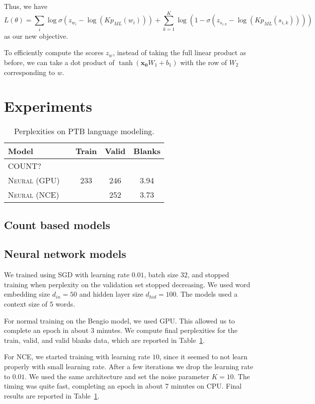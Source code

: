 \documentclass[11pt]{article}
\begin{document}
Thus, we have
$$L(\theta) = \sum_i \log \sigma(z_{w_i} - \log (Kp_{ML}(w_i))) + \sum_{k=1}^K \log(1 - \sigma(z_{s_{i,k}} - \log(Kp_{ML}(s_{i,k}))))$$
as our new objective.

To efficiently compute the scores $z_{w}$, instead of taking the full linear product as before, we can take a dot product of $\tanh(\mathbf{x_0}W_1 + b_1)$ with the row of $W_2$ corresponding to $w$.

\section{Experiments}

\begin{table}[h]
\centering
\begin{tabular}{llccc}
 \toprule
 Model &  & Train & Valid & Blanks\\
 \midrule
\textsc{COUNT?} & & & & \\
 \textsc{Neural (GPU)} & & 233 & 246 & 3.94\\
 \textsc{Neural (NCE)} & & & 252 & 3.73 \\
 \bottomrule
\end{tabular}
\caption{\label{tab:results} Perplexities on PTB language modeling.}
\end{table}

\subsection{Count based models}

\subsection{Neural network models}

We trained using SGD with learning rate $0.01$, batch size 32, and stopped training when perplexity on the validation set stopped decreasing. We used word embedding size $d_{in} = 50$ and hidden layer size $d_{hid} = 100$. The models used a context size of 5 words.

For normal training on the Bengio model, we used GPU. This allowed us to complete an epoch in about 3 minutes. We compute final perplexities for the train, valid, and valid blanks data, which are reported in Table~\ref{tab:results}.

For NCE, we started training with learning rate $10$, since it seemed to not learn properly with small learning rate. After a few iterations we drop the learning rate to $0.01$. We used the same architecture and set the noise parameter $K = 10$. The timing was quite fast, completing an epoch in about 7 minutes on CPU. Final results are reported in Table~\ref{tab:results}.
\end{document}
